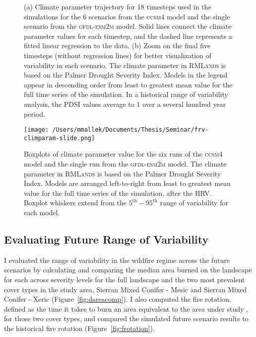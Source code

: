 \begin{figure}[!htbp]
\centering
    \caption{(a) Climate parameter trajectory for 18 timesteps used in the simulations for the 6 scenarios from the \textsc{ccsm4} model and the single scenario from the \textsc{gfdl-esm2m} model. Solid lines connect the climate parameter values for each timestep, and the dashed line represents a fitted linear regression to the data. (b) Zoom on the final five timesteps (without regression lines) for better visualization of variability in each scenario. The climate parameter in \textsc{RMLands} is based on the Palmer Drought Severity Index. Models in the legend appear in descending order from least to greatest mean value for the full time series of the simulation. In a historical range of variability analysis, the PDSI values average to 1 over a several hundred year period.}
\label{fig:pdsi_future}

\end{figure}

\begin{figure}[!htbp]
\centering
\texttt{[image: /Users/mmallek/Documents/Thesis/Seminar/frv-climparam-slide.png]}
\caption{Boxplots of climate parameter value for the six runs of the \textsc{ccsm4} model and the single run from the \textsc{gfdl-esm2m} model. The climate parameter in \textsc{RMLands} is based on the Palmer Drought Severity Index. Models are arranged left-to-right from least to greatest mean value for the full time series of the simulation, after the HRV. Boxplot whiskers extend from the $5^{\text{th}}-95^{\text{th}}$ range of variability for each model.}
\label{pdsi-boxplots}
\end{figure}


\subsection*{Evaluating Future Range of Variability}
I evaluated the range of variability in the wildfire regime across the future scenarios by calculating and comparing the median area burned on the landscape for each across severity levels for the full landscape and the two most prevalent cover types in the study area, Sierran Mixed Conifer - Mesic and Sierran Mixed Conifer - Xeric (Figure~\ref{fig:dareacomp}). %
I also computed the fire rotation, defined as the time it takes to burn an area equivalent to the area under study \citep{Agee1993}, for those two cover types, and compared the simulated future scenario results to the historical fire rotation (Figure~\ref{fig:frotation}). 
%


